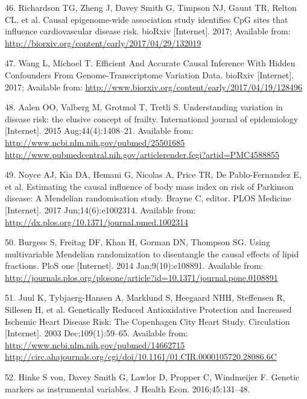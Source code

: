 \documentclass[]{article}
\begin{document}
\hypertarget{ref-Richardson2017}{}
46. Richardson TG, Zheng J, Davey Smith G, Timpson NJ, Gaunt TR, Relton
CL, et al. Causal epigenome-wide association study identifies CpG sites
that influence cardiovascular disease risk. bioRxiv {[}Internet{]}.
2017; Available from:
\url{http://biorxiv.org/content/early/2017/04/29/132019}

\hypertarget{ref-Wang2017}{}
47. Wang L, Michoel T. Efficient And Accurate Causal Inference With
Hidden Confounders From Genome-Transcriptome Variation Data. bioRxiv
{[}Internet{]}. 2017; Available from:
\url{http://www.biorxiv.org/content/early/2017/04/19/128496}

\hypertarget{ref-Aalen2015}{}
48. Aalen OO, Valberg M, Grotmol T, Tretli S. Understanding variation in
disease risk: the elusive concept of frailty. International journal of
epidemiology {[}Internet{]}. 2015 Aug;44(4):1408--21. Available from:
\href{http://www.ncbi.nlm.nih.gov/pubmed/25501685\%20http://www.pubmedcentral.nih.gov/articlerender.fcgi?artid=PMC4588855}{http://www.ncbi.nlm.nih.gov/pubmed/25501685 http://www.pubmedcentral.nih.gov/articlerender.fcgi?artid=PMC4588855}

\hypertarget{ref-Noyce2017}{}
49. Noyce AJ, Kia DA, Hemani G, Nicolas A, Price TR, De Pablo-Fernandez
E, et al. Estimating the causal influence of body mass index on risk of
Parkinson disease: A Mendelian randomisation study. Brayne C, editor.
PLOS Medicine {[}Internet{]}. 2017 Jun;14(6):e1002314. Available from:
\url{http://dx.plos.org/10.1371/journal.pmed.1002314}

\hypertarget{ref-Burgess2014a}{}
50. Burgess S, Freitag DF, Khan H, Gorman DN, Thompson SG. Using
multivariable Mendelian randomization to disentangle the causal effects
of lipid fractions. PloS one {[}Internet{]}. 2014 Jan;9(10):e108891.
Available from:
\url{http://journals.plos.org/plosone/article?id=10.1371/journal.pone.0108891}

\hypertarget{ref-Juul2003}{}
51. Juul K, Tybjaerg-Hansen A, Marklund S, Heegaard NHH, Steffensen R,
Sillesen H, et al. Genetically Reduced Antioxidative Protection and
Increased Ischemic Heart Disease Risk: The Copenhagen City Heart Study.
Circulation {[}Internet{]}. 2003 Dec;109(1):59--65. Available from:
\href{http://www.ncbi.nlm.nih.gov/pubmed/14662715\%20http://circ.ahajournals.org/cgi/doi/10.1161/01.CIR.0000105720.28086.6C}{http://www.ncbi.nlm.nih.gov/pubmed/14662715 http://circ.ahajournals.org/cgi/doi/10.1161/01.CIR.0000105720.28086.6C}

\hypertarget{ref-VonHinke2016}{}
52. Hinke S von, Davey Smith G, Lawlor D, Propper C, Windmeijer F.
Genetic markers as instrumental variables. J Health Econ.
2016;45:131--48.
\end{document}
